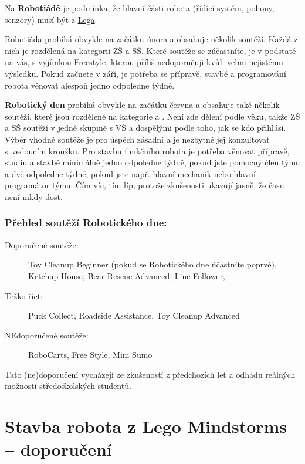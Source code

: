 Na \textbf{Robotiádě}  je podmínka, že hlavní části robota (řídící systém, pohony, senzory) musí být z \hyperref[lego:stavba]{Lega}.  

 Robotiáda probíhá obvykle na začátku února a obsahuje několik soutěží. Každá z nich je rozdělená na kategorii ZŠ a SŠ. 
Které soutěže se zúčastníte, je v podstatě na vás, s vyjímkou Freestyle, kterou příliš nedoporučuji kvůli velmi nejistému výsledku. Pokud začnete v září, je potřeba se přípravě, stavbě a programování robota věnovat alespoň jedno odpoledne týdně. 

\textbf{Robotický den}  probíhá obvykle na začátku června a obsahuje také několik soutěží, které jsou rozdělené na kategorie  a . 
Není zde dělení podle věku, takže ZŠ a SŠ soutěží v jedné skupině s VŠ a dospělými podle toho, jak se kdo přihlásí. 
Výběr vhodné soutěže je pro úspěch zásadní a je nezbytné jej konzultovat s~vedoucím kroužku.  
Pro stavbu funkčního robota je potřeba věnovat přípravě, studiu a stavbě minimálně jedno odpoledne týdně, pokud jste pomocný člen týmu a dvě odpoledne  týdně, pokud jste např. hlavní mechanik nebo hlavní programátor týmu. Čím víc, tím líp, protože \hyperref[denik]{zkušenosti} ukazují jasně, že času není nikdy dost. 

\subsubsection*{Přehled soutěží Robotického dne:}
\vspace{-0.7cm} 
\begin{description}
	\item[]
	\item[Doporučené soutěže:] Toy Cleanup Beginner (pokud se Robotického dne účastníte poprvé), Ketchup House, Bear Rescue Advanced, Line Follower, 
	\item[Težko říct:] Puck Collect, Roadside Assistance, Toy Cleanup Advanced
	\item[NEdoporučené soutěže:] RoboCarts, Free Style, Mini Sumo
\end{description}

Tato (ne)doporučení vycházejí ze zkušeností z předchozích let a odhadu reálných možností středoškolských studentů. 
 
\section{Stavba robota z Lego Mindstorms -- doporučení} \label{lego:stavba}

